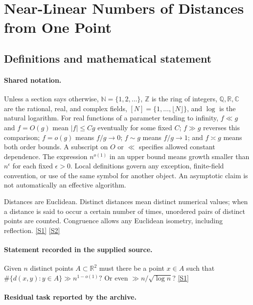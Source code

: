 \documentclass[11pt,a4paper]{article}
\newcommand{\N}{\mathbb{N}}
\newcommand{\Z}{\mathbb{Z}}
\newcommand{\Q}{\mathbb{Q}}
\newcommand{\R}{\mathbb{R}}
\newcommand{\C}{\mathbb{C}}
\newcommand{\sref}[2]{\hyperlink{source:#1:#2}{[S#2]}}
\begin{document}
\section{Near-Linear Numbers of Distances from One Point}\label{statement}


\subsection{Definitions and mathematical statement}

\paragraph{Shared notation.}Unless a section says otherwise, $\N=\{1,2,\ldots\}$,
$\Z$ is the ring of integers, $\Q,\R,\C$ are the rational, real, and complex
fields, $[N]=\{1,\ldots,\lfloor N\rfloor\}$, and $\log$ is the natural
logarithm. For real functions of a parameter tending to infinity,
$f\ll g$ and $f=O(g)$ mean $|f|\leq Cg$ eventually for some fixed $C$;
$f\gg g$ reverses this comparison; $f=o(g)$ means $f/g\to0$;
$f\sim g$ means $f/g\to1$; and $f\asymp g$ means both order bounds.
A subscript on $O$ or $\ll$ specifies allowed constant dependence.
The expression $n^{o(1)}$ in an upper bound means growth smaller than
$n^\epsilon$ for each fixed $\epsilon>0$. Local definitions govern any
exception, finite-field convention, or use of the same symbol for another
object. An asymptotic claim is not automatically an effective algorithm.



Distances are Euclidean. Distinct distances mean distinct numerical values; when a distance is said to occur a certain number of times, unordered pairs of distinct points are counted. Congruence allows any Euclidean isometry, including reflection. \sref{statement}{1} \sref{statement}{2}

\paragraph{Statement recorded in the supplied source.}
Given $n$ distinct points $A\subset\mathbb{R}^2$ must there be a point $x\in A$ such that $ \#\{ d(x,y) : y \in A\} \gg n^{1-o(1)}? $ Or even $\gg n/\sqrt{\log n}$? \sref{statement}{1}

\paragraph{Residual task reported by the archive.}
\end{document}
